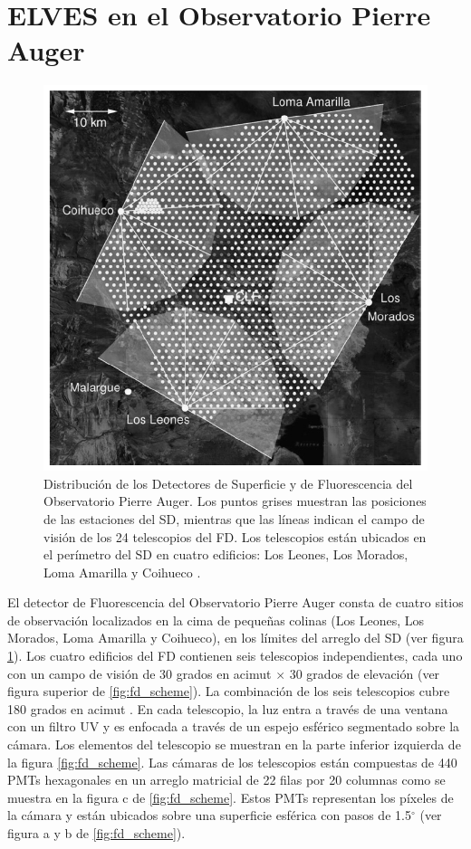\documentclass[12pt,oneside,openany,letter]{book}
\begin{document}
\section{ELVES en el Observatorio Pierre Auger}
\begin{figure}
    \centering
    \includegraphics[scale=0.5]{figures/auger_sites.png}
    \caption[Distribuci\'on de los Detectores de Superficie y Fluorescencia del Observatorio Pierre Auger.]{Distribuci\'on de los Detectores de Superficie y de Fluorescencia del Observatorio Pierre Auger. Los puntos grises muestran las posiciones de las estaciones del SD, mientras que las l\'ineas indican el campo de visi\'on de los 24 telescopios del FD. Los telescopios est\'an ubicados en el per\'imetro del SD en cuatro edificios: Los Leones, Los Morados, Loma Amarilla y Coihueco \cite{AbrahamEtal2010}. }
    \label{fig:auger_sites}
\end{figure}
El detector de Fluorescencia del Observatorio Pierre Auger consta de cuatro sitios de observaci\'on localizados en la cima de pequeñas colinas (Los Leones, Los Morados, Loma Amarilla y Coihueco), en los límites del arreglo del SD (ver figura \ref{fig:auger_sites}). Los cuatro edificios del FD contienen seis telescopios independientes, cada uno con un campo de visión de 30 grados en acimut $\times$ 30 grados de elevación (ver figura superior de \ref{fig:fd_scheme}). La combinación de los seis telescopios cubre 180 grados en acimut \cite{AbrahamEtal2010}. En cada telescopio, la luz entra a través de una ventana con un filtro UV y es enfocada a través de un espejo esférico segmentado sobre la cámara. Los elementos del telescopio se muestran en la parte inferior izquierda de la figura \ref{fig:fd_scheme}. Las c\'amaras de los telescopios est\'an compuestas de 440 PMTs hexagonales en un arreglo matricial de 22 filas por 20 columnas como se muestra en la figura c de \ref{fig:fd_scheme}. Estos PMTs representan los p\'ixeles de la c\'amara y est\'an ubicados sobre una superficie esf\'erica con pasos de 1.5$^\circ$ \cite{AbrahamEtal2010} (ver figura a y b de \ref{fig:fd_scheme}). 
\end{document}
